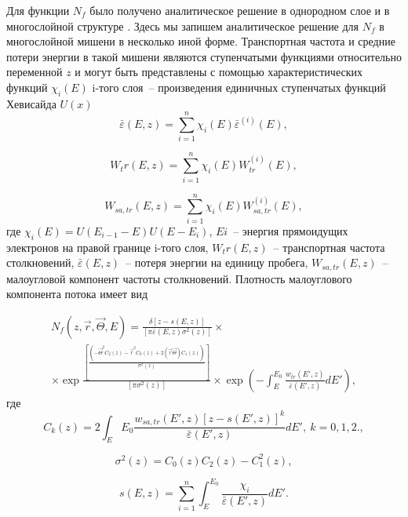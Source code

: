 Для функции $N_f$ было получено аналитическое решение в однородном слое \cite{smolar2} и в
многослойной структуре \cite{smolar}. Здесь мы запишем аналитическое решение для $N_f$ в
многослойной мишени в несколько иной форме. Транспортная частота и средние потери
энергии в такой мишени являются ступенчатыми функциями относительно переменной $z$
и могут быть представлены с помощью характеристических функций $\chi_i(E)$ i-того слоя~-- 
произведения единичных ступенчатых функций Хевисайда $U(x)$
\begin{equation}
\bar{\varepsilon}(E,z)=\sum_{i=1}^n \chi_i (E)\bar{\varepsilon}^{(i)} (E),
\label{eq:2}
\end{equation}

\begin{equation}
W_tr(E,z)=\sum_{i=1}^n \chi_i (E)W_{tr}^{(i)} (E),
\label{eq:3}
\end{equation}

\begin{equation}
W_{sa,tr}(E,z)=\sum_{i=1}^n \chi_i (E)W_{sa,tr}^{(i)} (E),
\label{eq:4}
\end{equation}
где
$ \chi_i(E)=U(E_{i-1}-E)U(E-E_i) $,
$Ei$~-- энергия прямоидущих электронов на правой границе i-того слоя, $W_tr(E,z)$~-- 
транспортная частота столкновений, $\bar{\varepsilon}(E,z)$~-- потеря энергии на единицу пробега, $W_{sa,tr}(E,z)$~-- малоугловой компонент частоты столкновений.
Плотность малоуглового компонента потока имеет вид \cite{smolar}

\begin{gather}
N_f(z,\vec{r},\vec{\Theta},E)=\frac{\delta[z-s(E,z)]}{[\pi \bar{\varepsilon}(E,z)\sigma^2(z)]}\times\nonumber\\
\times \exp \frac{[\frac{(-\vec{\Theta}^2 C_2(z)-\vec{r}^2C_0 (z)+2(\vec{r}\vec{\Theta})C_1(z))}{\sigma^2(z)}]}{[\pi\sigma^2(z)]} \times \exp\left(-\int_{E}^{E_0} \frac{w_{tr}(E',z)}{\bar{\varepsilon}(E',z)}dE'\right),
\label{eq:6}
\end{gather}
где
\begin{equation}
C_k(z)=2 \int_{E}{E_0} \frac{w_{sa,tr}(E',z)[z-s(E',z)]^k}{\bar{\varepsilon}(E',z)} dE',\ k=0,1,2.,
\label{eq:7}
\end{equation}

\begin{equation}
\sigma^2(z)=C_0(z)C_2(z)-C_1^2(z),
\label{eq:8}
\end{equation}

\begin{equation}
s(E,z)=\sum_{i=1}^{n} \int_{E}^{E_0} \frac{\chi_i}{\bar{\varepsilon}(E',z)} dE'.
\label{eq:9}
\end{equation}

